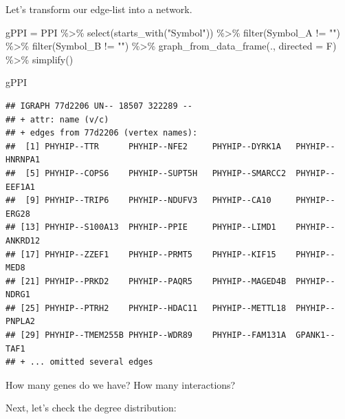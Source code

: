 \documentclass[
]{book}
\newenvironment{Shaded}{\begin{snugshade}}{\end{snugshade}}
\newcommand{\AttributeTok}[1]{\textcolor[rgb]{0.77,0.63,0.00}{#1}}
\newcommand{\FunctionTok}[1]{\textcolor[rgb]{0.00,0.00,0.00}{#1}}
\newcommand{\NormalTok}[1]{#1}
\newcommand{\OtherTok}[1]{\textcolor[rgb]{0.56,0.35,0.01}{#1}}
\newcommand{\SpecialCharTok}[1]{\textcolor[rgb]{0.00,0.00,0.00}{#1}}
\newcommand{\StringTok}[1]{\textcolor[rgb]{0.31,0.60,0.02}{#1}}
\begin{document}
Let's transform our edge-list into a network.

\begin{Shaded}
\begin{Highlighting}[]
\NormalTok{gPPI }\OtherTok{=}\NormalTok{ PPI }\SpecialCharTok{\%\textgreater{}\%} 
  \FunctionTok{select}\NormalTok{(}\FunctionTok{starts\_with}\NormalTok{(}\StringTok{"Symbol"}\NormalTok{)) }\SpecialCharTok{\%\textgreater{}\%}
  \FunctionTok{filter}\NormalTok{(Symbol\_A }\SpecialCharTok{!=} \StringTok{""}\NormalTok{) }\SpecialCharTok{\%\textgreater{}\%}
  \FunctionTok{filter}\NormalTok{(Symbol\_B }\SpecialCharTok{!=} \StringTok{""}\NormalTok{) }\SpecialCharTok{\%\textgreater{}\%}
  \FunctionTok{graph\_from\_data\_frame}\NormalTok{(., }\AttributeTok{directed =}\NormalTok{ F) }\SpecialCharTok{\%\textgreater{}\%}
  \FunctionTok{simplify}\NormalTok{()}

\NormalTok{gPPI}
\end{Highlighting}
\end{Shaded}

\begin{verbatim}
## IGRAPH 77d2206 UN-- 18507 322289 -- 
## + attr: name (v/c)
## + edges from 77d2206 (vertex names):
##  [1] PHYHIP--TTR      PHYHIP--NFE2     PHYHIP--DYRK1A   PHYHIP--HNRNPA1 
##  [5] PHYHIP--COPS6    PHYHIP--SUPT5H   PHYHIP--SMARCC2  PHYHIP--EEF1A1  
##  [9] PHYHIP--TRIP6    PHYHIP--NDUFV3   PHYHIP--CA10     PHYHIP--ERG28   
## [13] PHYHIP--S100A13  PHYHIP--PPIE     PHYHIP--LIMD1    PHYHIP--ANKRD12 
## [17] PHYHIP--ZZEF1    PHYHIP--PRMT5    PHYHIP--KIF15    PHYHIP--MED8    
## [21] PHYHIP--PRKD2    PHYHIP--PAQR5    PHYHIP--MAGED4B  PHYHIP--NDRG1   
## [25] PHYHIP--PTRH2    PHYHIP--HDAC11   PHYHIP--METTL18  PHYHIP--PNPLA2  
## [29] PHYHIP--TMEM255B PHYHIP--WDR89    PHYHIP--FAM131A  GPANK1--TAF1    
## + ... omitted several edges
\end{verbatim}

How many genes do we have? How many interactions?

Next, let's check the degree distribution:
\end{document}
